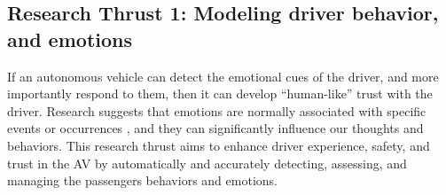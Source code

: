 \subsection{Research Thrust 1: Modeling driver behavior, and emotions}
\label{sec:behaviour}

 If an autonomous vehicle can detect the emotional cues of the driver, and more importantly respond to them, then it can develop ``human-like'' trust with the driver.
 Research suggests that emotions are normally associated with specific events or occurrences \cite{cowie2001emotion}, and they can significantly influence our thoughts and behaviors. 
 This research thrust aims to enhance driver experience, safety, and trust in the AV by automatically and accurately detecting, assessing, and managing the passengers behaviors and emotions. 
 
